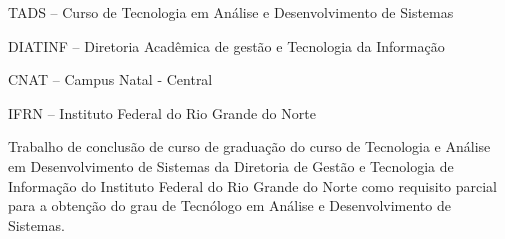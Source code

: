 
\instituicao
{
   TADS -- Curso de Tecnologia em Análise e Desenvolvimento de
   Sistemas\par 
   DIATINF -- Diretoria Acadêmica de gestão e Tecnologia da Informação\par 
   CNAT -- Campus Natal - Central\par 
   IFRN -- Instituto Federal do Rio Grande do Norte }
	
\comentario
{
	Trabalho de conclusão de curso de graduação do curso de Tecnologia e Análise em
	Desenvolvimento de Sistemas da Diretoria de Gestão e Tecnologia de Informação
	do Instituto Federal do Rio Grande do Norte como requisito parcial para a
	obtenção do grau de Tecnólogo em Análise e Desenvolvimento de
	Sistemas.\bigskip\\
}
		
	
\folhaderosto